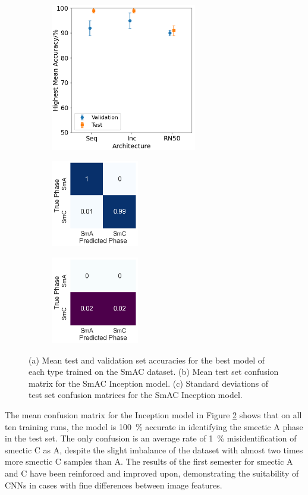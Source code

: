 \documentclass[12pt]{article}
\begin{document}
\begin{figure}[!h]
\centering
\begin{subfigure}{0.4\textwidth}
	\centering
	\includegraphics[width=2.5in]{images/Graphs/SmAC.png}
	\caption{}
	\label{smac:graph}
\end{subfigure}%
\begin{subfigure}{0.25\textwidth}
	\centering
	\includegraphics[width=1.5in]{images/ConMats/SmAC_mean.png}
	\caption{}
	\label{smac:mean}
\end{subfigure}%
\begin{subfigure}{0.25\textwidth}
	\centering
	\includegraphics[width=1.5in]{images/ConMats/SmAC_std.png}
	\caption{}
	\label{smac:std}
\end{subfigure}%
\caption{(a) Mean test and validation set accuracies for the best model of each type trained on the SmAC dataset. (b) Mean test set confusion matrix for the SmAC Inception model. (c) Standard deviations of test set confusion matrices for the SmAC Inception model.}
\label{smac:smac}
\end{figure}

The mean confusion matrix for the Inception model in Figure \ref{smac:mean} shows that on all ten training runs, the model is \SI{100}{\percent} accurate in identifying the smectic A phase in the test set. The only confusion is an average rate of \SI{1}{\percent} misidentification of smectic C as A, despite the slight imbalance of the dataset with almost two times more smectic C samples than A. The results of the first semester for smectic A and C have been reinforced and improved upon, demonstrating the suitability of CNNs in cases with fine differences between image features. 
\end{document}
